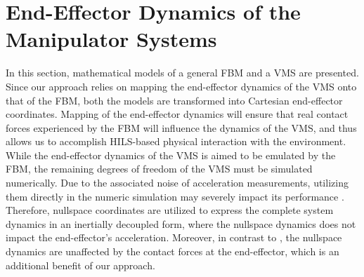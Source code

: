 \documentclass[../main.tex]{subfiles}
\begin{document}
\section{End-Effector Dynamics of the Manipulator Systems}
\label{sec:dynamics}
In this section, mathematical models of a general FBM and a VMS are presented. Since our approach relies on mapping the end-effector dynamics of the VMS onto that of the FBM, both the models are transformed into Cartesian end-effector coordinates. Mapping of the end-effector dynamics will ensure that real contact forces experienced by the FBM will influence the dynamics of the VMS, and thus allows us to accomplish HILS-based physical interaction with the environment. While the end-effector dynamics of the VMS is aimed to be emulated by the FBM, the remaining degrees of freedom of the VMS must be simulated numerically. Due to the associated noise of acceleration measurements, utilizing them directly in the numeric simulation may severely impact its performance \cite{mishra2020}. Therefore, nullspace coordinates \cite{park1999} are utilized to express the complete system dynamics in an inertially decoupled form, where the nullspace dynamics does not impact the end-effector's acceleration. Moreover, in contrast to \cite{aghili2000}, the nullspace dynamics are unaffected by the contact forces at the end-effector, which is an additional benefit of our approach.
\end{document}

